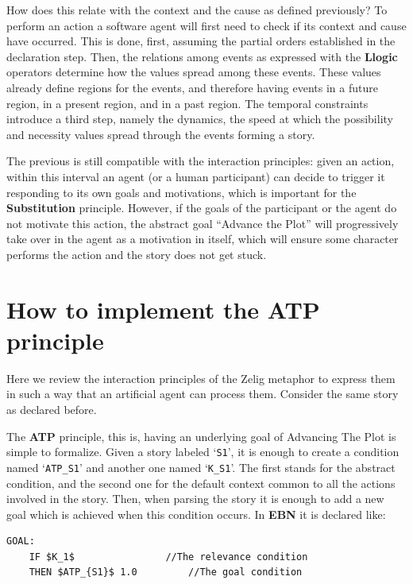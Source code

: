 \documentclass[
		twoside,openright,titlepage,numbers=noenddot,manychapters,
		headinclude,%
                footinclude=false,cleardoublepage=empty,
                BCOR=5mm,
		fontsize=11pt, %
                 enabledeprecatedfontcommands]{scrreprt}
\begin{document}
How does this relate with the context and the cause as defined previously? To perform an action a software agent will first need to check if its context and cause have occurred. This is done, first, assuming the partial orders established in the declaration step. Then, the relations among events as expressed with the \textbf{Llogic} operators determine how the values spread among these events. These values already define regions for the events, and therefore having events in a future region, in a present region, and in a past region. The temporal constraints introduce a third step, namely the dynamics, the speed at which the possibility and necessity values spread through the events forming a story. 



The previous is still compatible with the interaction principles: given an action, within this interval an agent (or a human participant) can decide to trigger it responding to its own goals and motivations, which is important for the \textbf{Substitution} principle. However, if the goals of the participant or the agent do not motivate this action, the abstract goal ``Advance the Plot'' will progressively take over in the agent as a motivation in itself, which will ensure some character performs the action and the story does not get stuck. 


\section{How to implement the ATP principle}

Here we review the interaction principles of the Zelig metaphor to express them in such a way that an artificial agent can process them.  Consider the same story as declared before.

The \textbf{ATP} principle, this is, having an underlying goal of Advancing The Plot is simple to formalize. Given a story labeled `\lstinline$S1$', it is enough to create a condition named  `\lstinline$ATP_S1$' and another one named `\lstinline$K_S1$'. The first stands for the abstract condition, and the second one for the default context common to all the actions involved in the story. Then, when parsing the story it is enough to add a new goal which is achieved when this condition occurs. In \textbf{EBN} it is declared like:
\begin{lstlisting}[mathescape]
GOAL:
	IF $K_1$ 				//The relevance condition
	THEN $ATP_{S1}$ 1.0			//The goal condition
\end{lstlisting}
\end{document}

